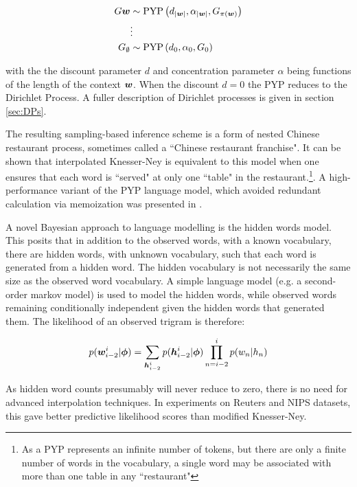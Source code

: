 \begin{align}
G\bm w & \sim \text{PYP}\left(d_{|\bm w|}, \alpha_{|\bm w|}, G_{\pi(\bm w)} \right) \\
& \vdots \\
G_{\emptyset} &\sim \text{PYP}\left(d_0, \alpha_0, G_0\right)
\end{align}

with the the discount parameter $d$ and concentration parameter $\alpha$ being functions of the length of the context $\bm w$. When the discount $d=0$ the PYP reduces to the Dirichlet Process. A fuller description of Dirichlet processes is given in section \ref{sec:DPs}.

The resulting sampling-based inference scheme is a form of nested Chinese restaurant process, sometimes called a ``Chinese restaurant franchise". It can be shown that interpolated Knesser-Ney is equivalent to this model when one ensures that each word is ``served" at only one ``table" in the restaurant.\footnote{As a PYP represents an infinite number of tokens, but there are only a finite number of words in the vocabulary, a single word may be associated with more than one table in any ``restaurant"}. A high-performance variant of the PYP language model, which avoided redundant calculation via memoization was presented in \cite{Wood2011}.

A novel Bayesian approach to language modelling is the hidden words model\cite{Deschacht2012}. This posits that in addition to the observed words, with a known vocabulary, there are hidden words, with unknown vocabulary, such that each word is generated from a hidden word. The hidden vocabulary is not necessarily the same size as the observed word vocabulary. A simple language model (e.g. a second-order markov model) is used to model the hidden words, while observed words remaining conditionally independent given the hidden words that generated them. The likelihood of an observed trigram is therefore:

\begin{align}
p(\bm w^i_{i-2}|\bm \phi) = \sum_{\bm h^i_{i-2}} p(\bm h^i_{i-2}|\bm \phi) \prod_{n=i-2}^i p(w_n | h_n)
\end{align}

As hidden word counts presumably will never reduce to zero, there is no need for advanced interpolation techniques. In experiments on Reuters and NIPS datasets, this gave better predictive likelihood scores than modified Knesser-Ney.


